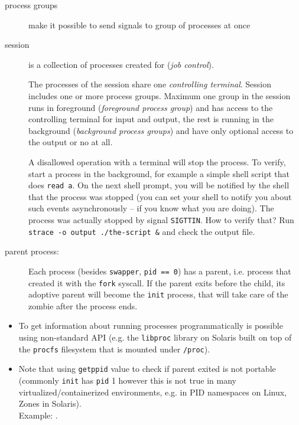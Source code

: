 \begin{description}
\item[process groups] make it possible to send signals to group of processes
at once
\item[session] is a collection of processes created for (\emph{job control}).

The processes of the session share one \emph{controlling terminal}.
Session includes one or more process groups. Maximum one group in the session
runs in foreground (\emph{foreground process group}) and has access to the
controlling terminal for input and output, the rest is running in the background
(\emph{background process groups}) and have only optional access to the output
or no at all.

A disallowed operation with a terminal will stop the process.  To verify, start
a process in the background, for example a simple shell script that does
\texttt{read a}.  On the next shell prompt, you will be notified by the shell
that the process was stopped (you can set your shell to notify you about such
events asynchronously -- if you know what you are doing).  The process was
actually stopped by signal \texttt{SIGTTIN}.  How to verify that?  Run
\texttt{strace -o output ./the-script \&} and check the output file.

\item[parent process:] Each process (besides \texttt{swapper},
\texttt{pid~==~0})
has a parent, i.e. process that created it with the \texttt{fork} syscall.
If the parent exits before the child, its adoptive parent will become the
\texttt{init} process, that will take care of the zombie after the process ends.
\end{description}
\begin{itemize}
\item To get information about running processes programmatically is possible
using non-standard API (e.g. the \texttt{libproc} library on Solaris built
on top of the \texttt{procfs} filesystem that is mounted under \texttt{/proc}).
\item Note that using \texttt{getppid} value to check if parent exited is not
portable (commonly \texttt{init} has \texttt{pid} 1 however this is not true in
many virtualized/containerized environments, e.g. in PID namespaces on Linux,
Zones in Solaris).\\
Example: .
\end{itemize}



